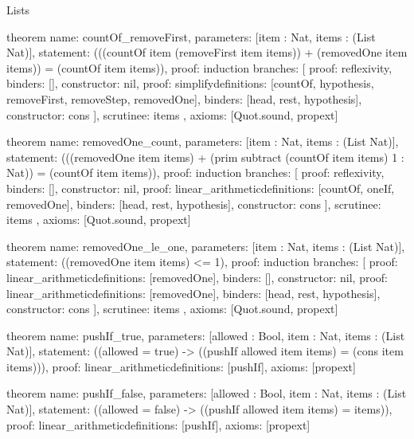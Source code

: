 \begin{lexlean}{Lists}
\begin{semanticmodule}
theorem{
  name: countOf_removeFirst,
  parameters: [item : Nat, items : (List Nat)],
  statement: (((countOf item (removeFirst item items)) + (removedOne item items)) = (countOf item items)),
  proof: induction{
    branches: [
      {proof: reflexivity{}, binders: [], constructor: nil},
      {
        proof: simplify{definitions: [countOf, hypothesis, removeFirst, removeStep, removedOne]},
        binders: [head, rest, hypothesis],
        constructor: cons
      }
    ],
    scrutinee: items
  },
  axioms: [Quot.sound, propext]
}

theorem{
  name: removedOne_count,
  parameters: [item : Nat, items : (List Nat)],
  statement: (((removedOne item items) + (prim subtract (countOf item items) 1 : Nat)) = (countOf item items)),
  proof: induction{
    branches: [
      {proof: reflexivity{}, binders: [], constructor: nil},
      {
        proof: linear_arithmetic{definitions: [countOf, oneIf, removedOne]},
        binders: [head, rest, hypothesis],
        constructor: cons
      }
    ],
    scrutinee: items
  },
  axioms: [Quot.sound, propext]
}

theorem{
  name: removedOne_le_one,
  parameters: [item : Nat, items : (List Nat)],
  statement: ((removedOne item items) <= 1),
  proof: induction{
    branches: [
      {proof: linear_arithmetic{definitions: [removedOne]}, binders: [], constructor: nil},
      {
        proof: linear_arithmetic{definitions: [removedOne]},
        binders: [head, rest, hypothesis],
        constructor: cons
      }
    ],
    scrutinee: items
  },
  axioms: [Quot.sound, propext]
}

theorem{
  name: pushIf_true,
  parameters: [allowed : Bool, item : Nat, items : (List Nat)],
  statement: ((allowed = true) -> ((pushIf allowed item items) = (cons item items))),
  proof: linear_arithmetic{definitions: [pushIf]},
  axioms: [propext]
}

theorem{
  name: pushIf_false,
  parameters: [allowed : Bool, item : Nat, items : (List Nat)],
  statement: ((allowed = false) -> ((pushIf allowed item items) = items)),
  proof: linear_arithmetic{definitions: [pushIf]},
  axioms: [propext]
}
\end{semanticmodule}
\end{lexlean}
